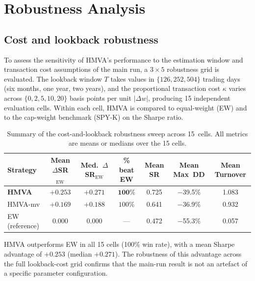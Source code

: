 \documentclass[a4paper,12pt]{report}
\begin{document}
\chapter{Robustness Analysis}
\label{ch:robustness}

\section{Cost and lookback robustness}
\label{sec:rob-cost}

To assess the sensitivity of HMVA's performance to the estimation window and
transaction cost assumptions of the main run, a $3 \times 5$ robustness grid
is evaluated. The lookback window $T$ takes values in $\{126, 252, 504\}$
trading days (six months, one year, two years), and the proportional
transaction cost $\kappa$ varies across $\{0, 2, 5, 10, 20\}$ basis points
per unit $|\Delta w|$, producing 15 independent evaluation cells. Within each
cell, HMVA is compared to equal-weight (EW) and to the cap-weight benchmark
(SPY-K) on the Sharpe ratio.

\begin{table}[H]
  \centering
  \caption{Summary of the cost-and-lookback robustness sweep across
           15~cells. All metrics are means or medians over the 15 cells.}
  \label{tab:rob-summary}
  \begin{tabular}{@{}lcccccc@{}}
    \toprule
    Strategy & Mean $\Delta$SR$_{\text{EW}}$ & Med.\ $\Delta$SR$_{\text{EW}}$ &
      \% beat EW & Mean SR & Mean Max~DD & Mean Turnover \\
    \midrule
    \textbf{HMVA}    & $+\mathbf{0.253}$ & $+\mathbf{0.271}$
      & $\mathbf{100\%}$ & 0.725 & $-$39.5\% & 1.083 \\
    HMVA-mv & $+0.169$ & $+0.188$ & $100\%$ & 0.641 & $-$36.9\% & 0.932 \\
    \midrule
    EW (reference) & 0.000 & 0.000 & --- & 0.472 & $-$55.3\% & 0.057 \\
    \bottomrule
  \end{tabular}
\end{table}

HMVA outperforms EW in all 15 cells (100\% win rate), with a mean Sharpe
advantage of $+0.253$ (median $+0.271$). The robustness of this advantage
across the full lookback-cost grid confirms that the main-run result is not
an artefact of a specific parameter configuration.
\end{document}
